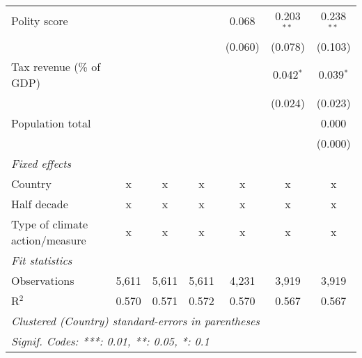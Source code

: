 \begin{tabular}{lcccccc}
   Polity score                                               &         &                &                & 0.068          & 0.203$^{**}$   & 0.238$^{**}$\\   
                                                              &         &                &                & (0.060)        & (0.078)        & (0.103)\\   
   Tax revenue (\% of GDP)                                    &         &                &                &                & 0.042$^{*}$    & 0.039$^{*}$\\   
                                                              &         &                &                &                & (0.024)        & (0.023)\\   
   Population total                                           &         &                &                &                &                & 0.000\\   
                                                              &         &                &                &                &                & (0.000)\\   
   \emph{Fixed effects}\\
   Country                                                    & x       & x              & x              & x              & x              & x\\  
   Half decade                                                & x       & x              & x              & x              & x              & x\\  
   Type of climate action/measure                             & x       & x              & x              & x              & x              & x\\  
   \midrule \emph{Fit statistics}\\
   Observations                                               & 5,611   & 5,611          & 5,611          & 4,231          & 3,919          & 3,919\\  
   R$^2$                                                      & 0.570   & 0.571          & 0.572          & 0.570          & 0.567          & 0.567\\  
   \midrule
   \multicolumn{7}{l}{\emph{Clustered (Country) standard-errors in parentheses}}\\
   \multicolumn{7}{l}{\emph{Signif. Codes: ***: 0.01, **: 0.05, *: 0.1}}\\
\end{tabular}
\par\endgroup


